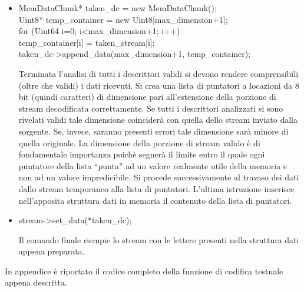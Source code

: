 \begin{itemize}
 \item \begin{code}
MemDataChunk* taken\_dc = new MemDataChunk();\\
Uint8* temp\_container = new Uint8[max\_dimension+1];\\
for (Uint64 i=0; i<max\_dimension+1; i++)\\
	temp\_container[i] = taken\_stream[i];\\
taken\_dc->append\_data(max\_dimension+1, temp\_container);\\
\end{code}
Terminata l'analisi di tutti i descrittori validi si devono rendere comprensibili (oltre che validi) i dati ricevuti. Si crea una lista di puntatori a locazioni da 8 bit (quindi caratteri) di dimensione pari all'estensione della porzione di stream decodificata correttamente. Se tutti i descrittori analizzati si sono rivelati validi tale dimensione coincider\`a con quella dello stream inviato dalla sorgente. Se, invece, saranno presenti errori tale dimensione sar\`a minore di quella originale. La dimensione della porzione di stream valido \`e di fondamentale importanza poich\`e segner\`a il limite entro il quale ogni puntatore della lista ``punta'' ad un valore realmente utile della memoria e non ad un valore impredicibile. Si procede successivamente al travaso dei dati dallo stream temporaneo alla lista di puntatori. L'ultima istruzione inserisce nell'apposita struttura dati in memoria il contenuto della lista di puntatori.

 \item \begin{code}
stream->set\_data(*taken\_dc);\\
\end{code}
Il comando finale riempie lo stream con le lettere presenti nella struttura dati appena preparata.
\end{itemize}
In appendice \`e riportato il codice completo della funzione di codifica testuale appena descritta.